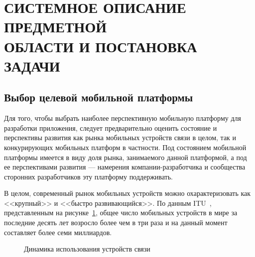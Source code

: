 \section[Системное описание предметной области и постановка задачи]{%
  СИСТЕМНОЕ ОПИСАНИЕ ПРЕДМЕТНОЙ \\
  ОБЛАСТИ И ПОСТАНОВКА ЗАДАЧИ
}\label{sec:spec}

\subsection{Выбор целевой мобильной платформы}

Для того, чтобы выбрать наиболее перспективную мобильную платформу
для разработки приложения, следует предварительно оценить состояние
и перспективы развития как рынка мобильных устройств связи в целом,
так и конкурирующих мобильных платформ в частности.
Под состоянием мобильной платформы имеется в виду
доля рынка, занимаемого данной платформой,
а под ее перспективами развития --- намерения компании-разработчика и
сообщества сторонних разработчиков эту платформу поддерживать.

В целом, современный рынок мобильных устройств можно охарактеризовать
как <<крупный>> и <<быстро развивающийся>>.
По данным ITU~\cite{itu_stat_phone}, представленным на
рисунке~\ref{fig:spec_stat_phones},
общее число мобильных устройств в мире за последние десять лет
возросло более чем в три раза
и на данный момент составляет более семи миллиардов.

\begin{figure}[h!]
  \centering
  \caption{Динамика использования устройств связи}
  \label{fig:spec_stat_phones}
\end{figure}

